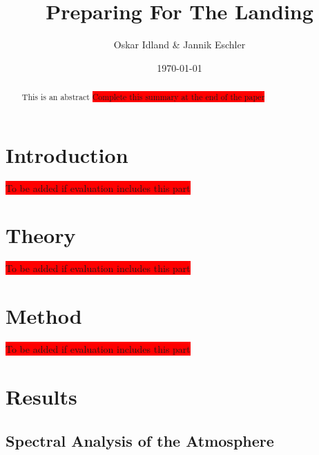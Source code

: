 \documentclass[reprint,english,notitlepage]{revtex4-2}
\begin{document}
\title{Preparing For The Landing}
\author{Oskar Idland \& Jannik Eschler}
\date{\today}

\begin{abstract}
    This is an abstract \colorbox{red}{Complete this summary at the end of the paper}
\end{abstract}
\maketitle
\section{Introduction} \label{sec:introduction}
\colorbox{red}{To be added if evaluation includes this part}
\section{Theory} \label{sec: theory}
\colorbox{red}{To be added if evaluation includes this part}
\section{Method} \label{sec: method}
\colorbox{red}{To be added if evaluation includes this part}

\section{Results} \label{sec: results}

\subsection{Spectral Analysis of the Atmosphere}
\onecolumngrid
\end{document}
